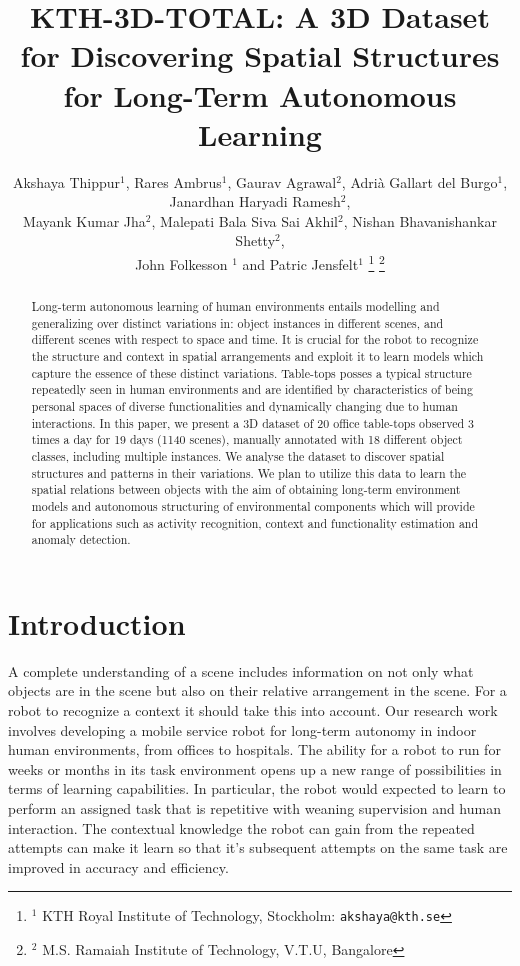 \documentclass[letterpaper, 10 pt, conference]{ieeeconf}  %
\title{\LARGE \bf
KTH-3D-TOTAL: A 3D Dataset for Discovering Spatial Structures for Long-Term Autonomous
 Learning
}
\author{Akshaya Thippur$^{1}$, Rares Ambrus$^{1}$, Gaurav Agrawal$^{2}$, Adri\`a Gallart del Burgo$^{1}$, Janardhan Haryadi Ramesh$^{2}$, \\Mayank Kumar Jha$^{2}$, Malepati Bala Siva Sai Akhil$^{2}$,  Nishan Bhavanishankar Shetty$^{2}$, \\John Folkesson $^{1}$ and Patric Jensfelt$^{1}$%
\thanks{$^{1}$ KTH Royal Institute of Technology, Stockholm:
        {\tt\small akshaya@kth.se}}%
\thanks{$^{2}$ M.S. Ramaiah Institute of Technology, V.T.U, Bangalore}%
}
\begin{document}
\maketitle
\thispagestyle{empty}
\pagestyle{empty}

\begin{abstract}

Long-term autonomous learning of human environments entails modelling 
and generalizing over distinct variations in: object instances in different scenes, 
and different scenes with respect to space and time. It is crucial for the 
robot to recognize the structure and context in spatial arrangements and 
exploit it to learn models which capture the essence of these distinct variations.
Table-tops posses a typical structure repeatedly seen in human environments
and are identified by characteristics of being personal spaces of diverse
functionalities and dynamically changing due to human interactions. In this
paper, we present a 3D dataset of 20 office table-tops observed 3 times a 
day for 19 days (1140 scenes), manually annotated with 18 different object 
classes, including multiple instances. We analyse the dataset to discover 
spatial structures and patterns in their variations. We plan to utilize 
this data to learn the spatial relations between objects with the 
aim of obtaining long-term environment models and autonomous structuring 
of environmental components which will provide for applications such 
as activity recognition, context and functionality estimation and anomaly detection.

\end{abstract}


\section{Introduction}
\label{sec:Introduction}

A complete understanding of a scene includes information on not only 
what objects are in the scene but also on their relative arrangement in
the scene. For a robot to recognize a context it should take this into
account.  Our research work involves developing
a mobile service robot for long-term autonomy in indoor human
environments, from offices to hospitals.  The ability for a robot to
run for weeks or months in its task environment opens up a new range
of possibilities in terms of learning capabilities. In particular, the
robot would expected to learn to perform an assigned task that is
repetitive with weaning supervision and human interaction. The
contextual knowledge the robot can gain from the repeated attempts can
make it learn so that it's subsequent attempts on the same task are
improved in accuracy and efficiency.
\end{document}
